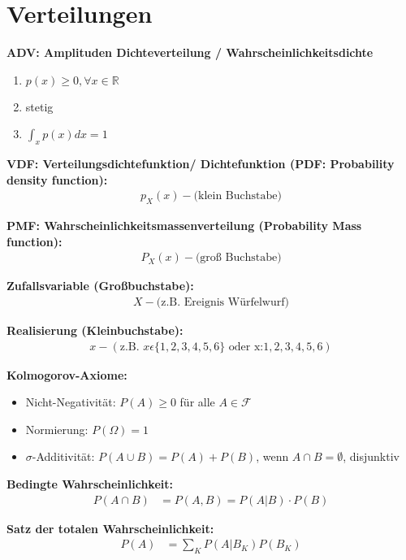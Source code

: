 \section{Verteilungen}

\textbf{ADV: Amplituden Dichteverteilung / Wahrscheinlichkeitsdichte}
\begin{enumerate}
\item $p(x) \geq 0, \forall x \in \mathbb{R}$
\item stetig
\item $\int_{x} p(x) dx = 1$
\end{enumerate}

\textbf{VDF: Verteilungsdichtefunktion/ Dichtefunktion (PDF: Probability density function):}
\begin{align}
p_X(x) - \text{(klein Buchstabe)}
\end{align}

\textbf{PMF: Wahrscheinlichkeitsmassenverteilung (Probability Mass function):}
\begin{align}
P_X(x) - \text{(groß Buchstabe)}
\end{align}

\textbf{Zufallsvariable (Großbuchstabe):}
\begin{align}
X - \text{(z.B. Ereignis Würfelwurf)}
\end{align}

\textbf{Realisierung (Kleinbuchstabe):}
\begin{align}
x - (\text{z.B. } x \epsilon \{1,2,3,4,5,6\} \text{ oder x:} 1,2,3,4,5,6)
\end{align}

\textbf{Kolmogorov-Axiome:} 
\begin{itemize}
\item Nicht-Negativität: $P(A) \geq 0$ für alle $A \in \mathcal{F}$
\item Normierung: $P(\Omega) = 1$
\item $\sigma$-Additivität: $P(A \cup B) = P(A) + P(B)$, wenn $A \cap B = \emptyset$, disjunktiv
\end{itemize}



\textbf{Bedingte Wahrscheinlichkeit:}
\begin{align}
P(A \cap B) &= P(A,B) = P(A|B) \cdot P(B)
\end{align}

\textbf{Satz der totalen Wahrscheinlichkeit:}
\begin{align}
P(A) &= \sum_K P(A|B_K)P(B_K)
\end{align}

